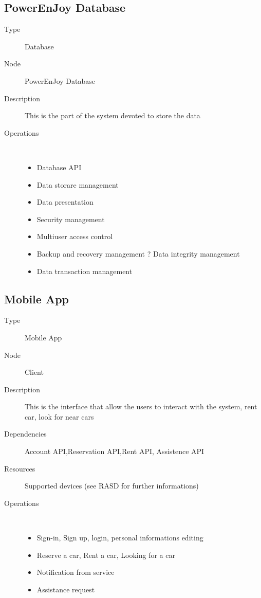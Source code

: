 \subsection{PowerEnJoy Database}
\begin{description}
	\item[Type] Database
	\item[Node] PowerEnJoy Database
	\item[Description] This is the part of the system devoted to store the data 
	\item[Operations] \ \\
		\begin{itemize}
			\item Database API
			\item Data storare management
			\item Data presentation
			\item Security management
			\item Multiuser access control
			\item Backup and recovery management ? Data integrity management
			\item Data transaction management	
		\end{itemize}
\end{description}

\subsection{Mobile App}
\begin{description}
	\item[Type] Mobile App
	\item[Node] Client
	\item[Description] This is the interface that allow the users to interact with the system, rent car, look for near cars
	\item[Dependencies] Account API,Reservation API,Rent API, Assistence API
	\item[Resources] Supported devices (see RASD for further informations)
	\item[Operations] \ \\
		\begin{itemize}
			\item Sign-in, Sign up, login, personal informations editing
			\item Reserve a car, Rent a car, Looking for a car
			\item Notification from service
			\item Assistance request
	\end{itemize}
\end{description}


